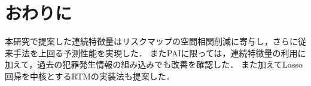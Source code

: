 \section{おわりに}
本研究で提案した連続特徴量はリスクマップの空間相関削減に寄与し，さらに従来手法を上回る予測性能を実現した．
またPAIに限っては，連続特徴量の利用に加えて，過去の犯罪発生情報の組み込みでも改善を確認した．
また加えてLasso回帰を中核とするRTMの実装法も提案した．


% 




